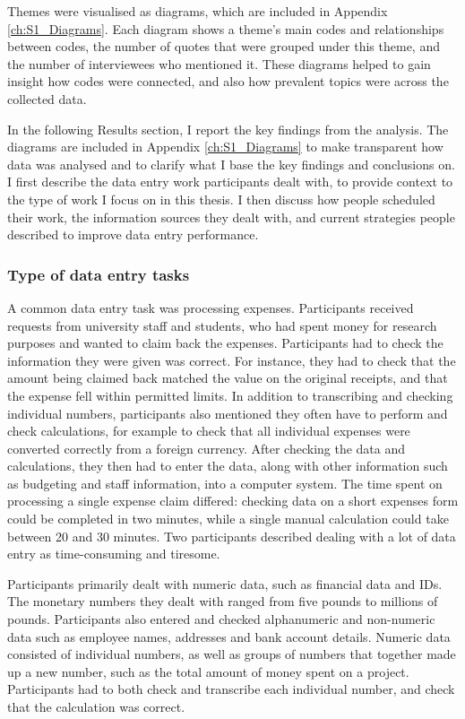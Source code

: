Themes were visualised as diagrams, which are included in Appendix \ref{ch:S1_Diagrams}. Each diagram shows a theme's main codes and relationships between codes, the number of quotes that were grouped under this theme, and the number of interviewees who mentioned it. These diagrams helped to gain insight how codes were connected, and also how prevalent topics were across the collected data. 

In the following Results section, I report the key findings from the analysis.  The diagrams are included in Appendix \ref{ch:S1_Diagrams} to make transparent how data was analysed and to clarify what I base the key findings and conclusions on. I first describe the data entry work participants dealt with, to provide context to the type of work I focus on in this thesis. I then discuss how people scheduled their work, the information sources they dealt with, and current strategies people described to improve data entry performance.

\subsubsection{Type of data entry tasks}
A common data entry task was processing expenses. Participants received requests from university staff and students, who had spent money for research purposes and wanted to claim back the expenses. Participants had to check the information they were given was correct. For instance, they had to check that the amount being claimed back matched the value on the original receipts, and that the expense fell within permitted limits. In addition to transcribing and checking individual numbers, participants also mentioned they often have to perform and check calculations, for example to check that all individual expenses were converted correctly from a foreign currency. After checking the data and calculations, they then had to enter the data, along with other information such as budgeting and staff information, into a computer system. The time spent on processing a single expense claim differed: checking data on a short expenses form could be completed in two minutes, while a single manual calculation could take between 20 and 30 minutes. Two participants described dealing with a lot of data entry as time-consuming and tiresome.

Participants primarily dealt with numeric data, such as financial data and IDs. The monetary numbers they dealt with ranged from five pounds to millions of pounds. Participants also entered and checked alphanumeric and non-numeric data such as employee names, addresses and bank account details. Numeric data consisted of individual numbers, as well as groups of numbers that together made up a new number, such as the total amount of money spent on a project. Participants had to both check and transcribe each individual number, and check that the calculation was correct. 

